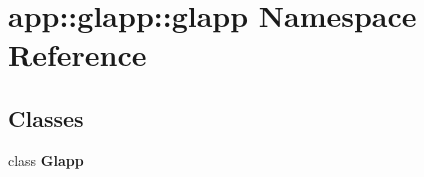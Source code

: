 \section{app::glapp::glapp Namespace Reference}
\label{namespaceapp_1_1glapp_1_1glapp}


\subsection*{Classes}
\begin{CompactItemize}
\item 
class {\bf Glapp}
\end{CompactItemize}
